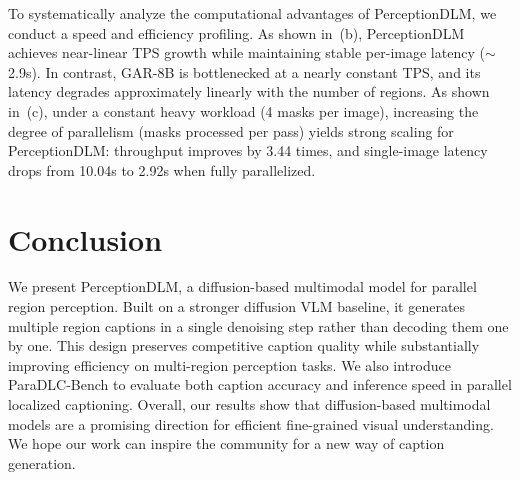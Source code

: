 \documentclass{llmxive}
\begin{document}
To systematically analyze the computational advantages of PerceptionDLM, we conduct a speed and efficiency profiling.
As shown in~(b), PerceptionDLM achieves near-linear TPS growth while maintaining stable per-image latency ($\sim$2.9s).
%
In contrast, GAR-8B is bottlenecked at a nearly constant TPS, and its latency degrades approximately linearly with the number of regions. 
%
As shown in~(c), under a constant heavy workload (4 masks per image), increasing the degree of parallelism (masks processed per pass) yields strong scaling for PerceptionDLM: throughput improves by 3.44 times, and single-image latency drops from 10.04s to 2.92s when fully parallelized.
\vspace{-3mm}
\section{Conclusion}
\label{sec:conclusion}
\vspace{-3mm}
We present PerceptionDLM, a diffusion-based multimodal model for parallel region perception.
Built on a stronger diffusion VLM baseline, it generates multiple region captions in a single denoising step rather than decoding them one by one.
%
This design preserves competitive caption quality while substantially improving efficiency on multi-region perception tasks.
%
We also introduce ParaDLC-Bench to evaluate both caption accuracy and inference speed in parallel localized captioning.
%
Overall, our results show that diffusion-based multimodal models are a promising direction for efficient fine-grained visual understanding.
%
We hope our work can inspire the community for a new way of caption generation.


\end{document}
